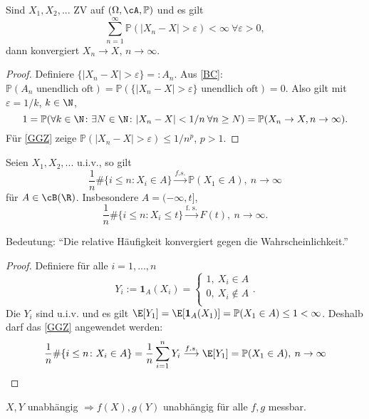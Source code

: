 \marginpar{\textcolor{red}{Vorlesung 27}}

\begin{lemma}
	Sind $X_1,X_2,...$ ZV auf $(\Omega, \cA, \mathbb{P})$ und es gilt 
	\[ \sum\limits_{n=1}^{\infty} \mathbb{P}(|X_n - X| > \varepsilon) < \infty \: \forall \varepsilon > 0, \] 
	dann konvergiert $X_n \to X$, $n \to \infty$.
\end{lemma}

\begin{proof}
	Definiere $\{ |X_n - X| > \varepsilon \} =: A_n$. Aus \ref{BC}: $\mathbb{P}(A_n \text{ unendlich oft}) = \mathbb{P}(\{ |X_n - X| > \varepsilon \} \text{ unendlich oft}) = 0$.
	Also gilt mit $\varepsilon = 1/k$, $k \in \N$,
	\[ 1 = \mathbb{P}(\forall k \in \N \colon \exists N \in \N \colon |X_n - X| < 1/n \: \forall n \geq N) = \mathbb{P}(X_n \to X, n \to \infty). \]
	Für \ref{GGZ} zeige $\mathbb{P}(|X_n - X| > \varepsilon) \leq 1/n^p$, $p > 1$.
\end{proof}

\begin{korollar}
	\makeatletter{}\makeatother\label{EGGZ}
	Seien $X_1,X_2,...$ u.i.v., so gilt \[ \frac{1}{n} \# \{ i \leq n \colon X_i \in A \} \overset{f. s.}{\longrightarrow} \mathbb{P}(X_1 \in A), \: n \to \infty \]
	für $A \in \cB(\R)$. Insbesondere $A = (-\infty,t]$,
	\[ \frac{1}{n} \# \{ i \leq n \colon X_i \leq t \} \overset{\text{f. s.}}{\longrightarrow} F(t), \: n \to \infty. \]
	
	Bedeutung: \enquote{Die relative Häufigkeit konvergiert gegen die Wahrscheinlichkeit.}
\end{korollar}

\begin{proof}
	Definiere für alle $i=1,...,n$ \[ Y_i := \mathbf{1}_{A}(X_i) = \begin{cases}
	1, \: X_i \in A\\
	0, \: X_i \notin A\\
	\end{cases}. \]
	Die $Y_i$ sind u.i.v. und es gilt $\E[Y_1] = \E[\mathbf{1}_{A}(X_1)] = \mathbb{P}(X_1 \in A) \leq 1 < \infty$. Deshalb darf das \ref{GGZ} angewendet werden:
	 \[ \frac{1}{n} \# \{ i \leq n \colon X_i \in A \} = \frac{1}{n} \sum\limits_{i=1}^{n} Y_i \overset{f. s.}{\longrightarrow} \E[Y_1] = \mathbb{P}(X_1 \in A), \: n \to \infty 
	 \]
\end{proof}

\begin{bem1}
	$X,Y$ unabhängig $\Rightarrow f(X), g(Y)$ unabhängig für alle $f,g$ messbar.
\end{bem1}

